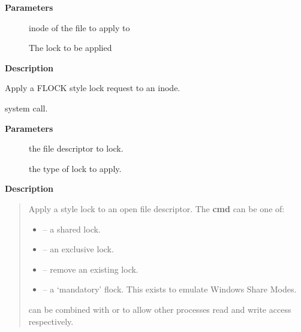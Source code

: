 \documentclass[a4paper,8pt,english]{sphinxmanual}
\begin{document}
\textbf{Parameters}
\begin{description}
\item[{}] \leavevmode
inode of the file to apply to

\item[{}] \leavevmode
The lock to be applied

\end{description}

\textbf{Description}

Apply a FLOCK style lock request to an inode.

\begin{fulllineitems}
\label{filesystems/index:c.sys_flock}
 system call.

\end{fulllineitems}


\textbf{Parameters}
\begin{description}
\item[{}] \leavevmode
the file descriptor to lock.

\item[{}] \leavevmode
the type of lock to apply.

\end{description}

\textbf{Description}
\begin{quote}

Apply a  style lock to an open file descriptor.
The \textbf{cmd} can be one of:
\begin{itemize}
\item {} 
 -- a shared lock.

\item {} 
 -- an exclusive lock.

\item {} 
 -- remove an existing lock.

\item {} 
 -- a `mandatory' flock.
This exists to emulate Windows Share Modes.

\end{itemize}

 can be combined with  or  to allow other
processes read and write access respectively.
\end{quote}
\end{document}
